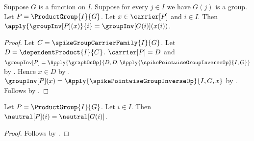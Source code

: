 \begin{proposition}\label{spike_product_group_inverse_coordinate}
    Suppose $G$ is a function on $I$.
    Suppose for every $j\in I$ we have $G(j)$ is a group.
    Let $P=\ProductGroup{I}{G}$.
    Let $x\in\carrier[P]$ and $i\in I$.
    Then
        $\apply{\groupInv[P](x)}{i}
            =\groupInv[G(i)](x(i))$.
\end{proposition}
\begin{proof}
    Let $C=\spikeGroupCarrierFamily{I}{G}$.
    Let $D=\dependentProduct{I}{C}$.
    $\carrier[P]=D$ and
        $\groupInv[P]=\Apply{\graphOnOp}{
            D,D,\Apply{\spikePointwiseGroupInverseOp}{I,G}}$ by
        .
    Hence $x\in D$ by \auto.
    $\groupInv[P](x)
        =\Apply{\spikePointwiseGroupInverseOp}{I,G,x}$ by
        .
    Follows by
        .
\end{proof}

\begin{proposition}\label{spike_product_group_neutral_coordinate_exact}
    Let $P=\ProductGroup{I}{G}$.
    Let $i\in I$.
    Then $\neutral[P](i)=\neutral[G(i)]$.
\end{proposition}
\begin{proof}
    Follows by
        .
\end{proof}

